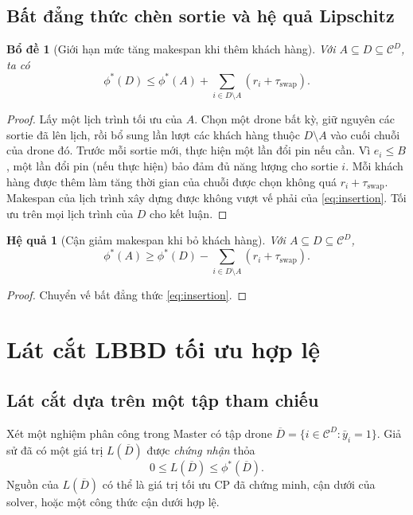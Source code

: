 \documentclass[11pt,a4paper]{article}
\theoremstyle{definition}
\theoremstyle{plain}
\newtheorem{lemma}{Bổ đề}[section]
\newtheorem{corollary}{Hệ quả}[section]
\theoremstyle{remark}
\newcommand{\CD}{\mathcal C^D}
\newcommand{\sw}{\tau_{\mathrm{swap}}}
\newcommand{\opt}{\phi^*}
\newcommand{\barD}{\overline D}
\begin{document}
\subsection{Bất đẳng thức chèn sortie và hệ quả Lipschitz}
\begin{lemma}[Giới hạn mức tăng makespan khi thêm khách hàng]\label{lem:insertion}
Với $A\subseteq D\subseteq\CD$, ta có
\begin{equation}\label{eq:insertion}
\opt(D)\le\opt(A)+\sum_{i\in D\setminus A}(r_i+\sw).
\end{equation}
\end{lemma}
\begin{proof}
Lấy một lịch trình tối ưu của $A$. Chọn một drone bất kỳ, giữ nguyên các sortie đã lên lịch, rồi bổ sung lần lượt các khách hàng thuộc $D\setminus A$ vào cuối chuỗi của drone đó. Trước mỗi sortie mới, thực hiện một lần đổi pin nếu cần. Vì $e_i\le B$, một lần đổi pin (nếu thực hiện) bảo đảm đủ năng lượng cho sortie $i$. Mỗi khách hàng được thêm làm tăng thời gian của chuỗi được chọn không quá $r_i+\sw$. Makespan của lịch trình xây dựng được không vượt vế phải của \eqref{eq:insertion}. Tối ưu trên mọi lịch trình của $D$ cho kết luận.
\end{proof}
\begin{corollary}[Cận giảm makespan khi bỏ khách hàng]\label{cor:remove}
Với $A\subseteq D\subseteq\CD$,
\begin{equation}\label{eq:removal}
\opt(A)\ge\opt(D)-\sum_{i\in D\setminus A}(r_i+\sw).
\end{equation}
\end{corollary}
\begin{proof}
Chuyển vế bất đẳng thức \eqref{eq:insertion}.
\end{proof}

\section{Lát cắt LBBD tối ưu hợp lệ}
\subsection{Lát cắt dựa trên một tập tham chiếu}
Xét một nghiệm phân công trong Master có tập drone $\barD=\{i\in\CD:\bar y_i=1\}$. Giả sử đã có một giá trị $L(\barD)$ được \emph{chứng nhận} thỏa
\[
0\le L(\barD)\le\opt(\barD).
\]
Nguồn của $L(\barD)$ có thể là giá trị tối ưu CP đã chứng minh, cận dưới của solver, hoặc một công thức cận dưới hợp lệ.
\end{document}

